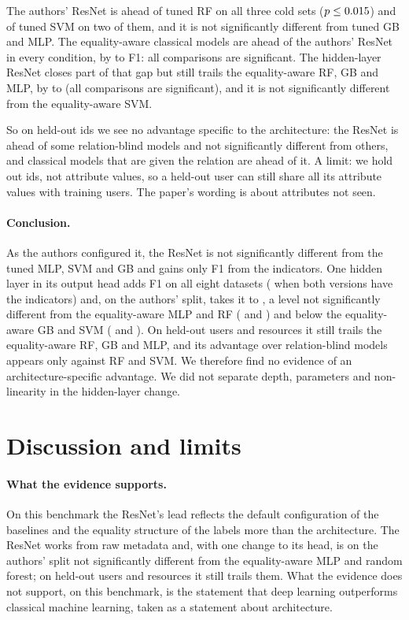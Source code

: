 \documentclass[11pt,a4paper]{article}
\begin{document}
The authors' ResNet is ahead of tuned RF on all three cold sets ($p\le0.015$) and of tuned SVM on two of them, and it is not significantly different from tuned GB and MLP. The equality-aware classical models are ahead of the authors' ResNet in every condition, by \cdSvmTunedEqUserColdU{} to \cdGbTunedEqBothColdU{} F1: all \coldAwareN{} comparisons are significant. The hidden-layer ResNet closes part of that gap but still trails the equality-aware RF, GB and MLP, by \chdGbTunedEqResourceColdU{} to \chdGbTunedEqBothColdU{} (all \coldHeadN{} comparisons are significant), and it is not significantly different from the equality-aware SVM.

So on held-out ids we see no advantage specific to the architecture: the ResNet is ahead of some relation-blind models and not significantly different from others, and classical models that are given the relation are ahead of it. A limit: we hold out ids, not attribute values, so a held-out user can still share all its attribute values with training users. The paper's wording is about attributes not seen.

\paragraph{Conclusion.} As the authors configured it, the ResNet is not significantly different from the tuned MLP, SVM and GB and gains only \vIndicatorsOnResnetU{} F1 from the indicators. One hidden layer in its output head adds \vHeadVsResnetU{} F1 on all eight datasets (\vHeadEqVsEqU{} when both versions have the indicators) and, on the authors' split, takes it to \fResnetHead{}, a level not significantly different from the equality-aware MLP and RF (\fMlpTunedEq{} and \fRfTunedEq{}) and below the equality-aware GB and SVM (\fGbTunedEq{} and \fSvmTunedEq{}). On held-out users and resources it still trails the equality-aware RF, GB and MLP, and its advantage over relation-blind models appears only against RF and SVM. We therefore find no evidence of an architecture-specific advantage. We did not separate depth, parameters and non-linearity in the hidden-layer change.

\section{Discussion and limits}

\paragraph{What the evidence supports.} On this benchmark the ResNet's lead reflects the default configuration of the baselines and the equality structure of the labels more than the architecture. The ResNet works from raw metadata and, with one change to its head, is on the authors' split not significantly different from the equality-aware MLP and random forest; on held-out users and resources it still trails them. What the evidence does not support, on this benchmark, is the statement that deep learning outperforms classical machine learning, taken as a statement about architecture.
\end{document}
